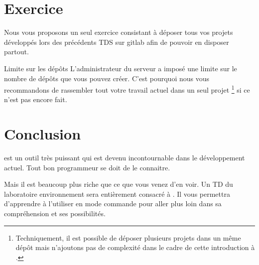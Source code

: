 \documentclass[a4paper,11pt]{style-esi/td}
\begin{document}
\newpage
\section{Exercice}

Nous vous proposons un seul exercice
consistant à déposer tous vos projets  développés
lors des précédents TDS sur gitlab afin de pouvoir en disposer partout.

\begin{infoit}{Limite sur les dépôts}
	L'administrateur du serveur 
	a imposé une limite sur le nombre de dépôts que
	vous pouvez créer.
	C'est pourquoi nous vous recommandons de rassembler tout votre travail 
	actuel dans un seul projet %
	\footnote{%
		Techniquement, 
		il est possible de déposer plusieurs projets 
		dans un même dépôt mais n'ajoutons pas de complexité
		dans le cadre de cette introduction à .
	}
	si ce n'est pas encore fait.
\end{infoit}

\section{Conclusion}

 est un outil très puissant qui est devenu incontournable
dans le développement actuel.
Tout bon programmeur se doit de le connaitre.

Mais il est beaucoup plus riche que ce que vous venez d'en voir.
Un TD du laboratoire environnement sera entièrement consacré à .
Il vous permettra d'apprendre à l'utiliser en mode commande
pour aller plus loin dans sa compréhension et ses possibilités.
\end{document}
